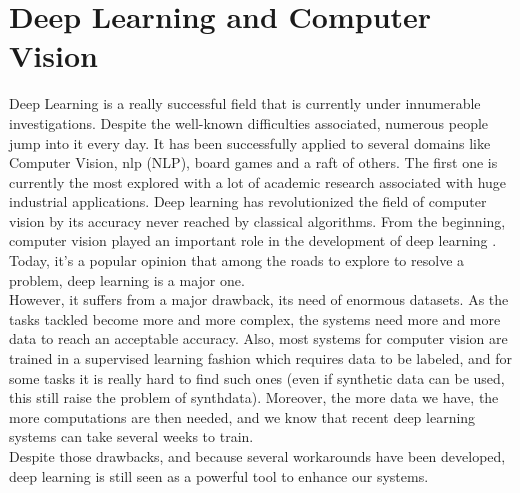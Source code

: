 \documentclass[12pt, a4paper]{report}
\begin{document}
	\section{Deep Learning and Computer Vision}
	Deep Learning is a really successful field that is currently under innumerable investigations.
	Despite the well-known difficulties associated, numerous people jump into it every day.
	It has been successfully applied to several domains like Computer Vision, \gls{nlp} (NLP), board games and a raft of others.
	The first one is currently the most explored with a lot of academic research associated with huge industrial applications.
	Deep learning has revolutionized the field of computer vision by its accuracy never reached by classical algorithms.
	From the beginning, computer vision played an important role in the development of deep learning \cite{lecun_89,lecun_98}.
	Today, it's a popular opinion that among the roads to explore to resolve a problem, deep learning is a major one.\\
	However, it suffers from a major drawback, its need of enormous datasets.
	As the tasks tackled become more and more complex, the systems need more and more data to reach an acceptable accuracy.
	Also, most systems for computer vision are trained in a supervised learning fashion which requires data to be labeled, and for some tasks it is really hard to find such ones (even if synthetic data can be used, this still raise the problem of \gls{synthdata}).
	Moreover, the more data we have, the more computations are then needed, and we know that recent deep learning systems can take several weeks to train.\\
	
	Despite those drawbacks, and because several workarounds have been developed, deep learning is still seen as a powerful tool to enhance our systems.
\end{document}
